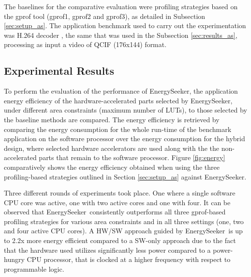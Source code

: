 \documentclass[]{usiinfthesis}
\newcommand{\eseeker}{{EnergySeeker}}
\begin{document}
The baselines for the comparative evaluation were profiling strategies based on the 
gprof tool (gprof1, gprof2 and gprof3), as detailed in Subsection \ref{sec:setup_as}. 
The application benchmark used to carry out the experimentation was H.264 decoder 
\cite{LiuFeb16}, the same that was used in the Subsection \ref{sec:results_as}, processing 
as input a video of QCIF (176x144) format.


\subsection{Experimental Results}
\label{sec:results_es}


To perform the evaluation of the performance of \eseeker, the application energy efficiency of the 
hardware-accelerated parts selected by \eseeker, under different area constraints (maximum number of 
LUTs), to those selected by the baseline methods are compared.
The energy efficiency is retrieved by comparing the energy consumption for the whole run-time of the 
benchmark application on the software processor over the energy consumption for the hybrid design, where 
selected hardware accelerators are used along with the the non-accelerated parts that remain to the  
software processor. Figure \ref{fig:energy} comparatively shows the energy efficiency obtained when using 
the three profiling-based strategies outlined in Section \ref{sec:setup_as} against \eseeker.\par

Three different rounds of experiments took place. One where a single software CPU core was active, one
with two active cores and one with four. It can be observed that \eseeker\ consistently outperforms all
three gprof-based profiling strategies for various area constraints and in all three settings (one, two 
and four active CPU cores). A HW/SW approach guided by \eseeker\ is up to 2.2x more energy efficient compared to 
a SW-only approach due to the fact that the hardware used utilizes significantly less power compared to a power-hungry 
CPU processor, that is clocked at a higher frequency with respect to programmable logic.\par
\end{document}
